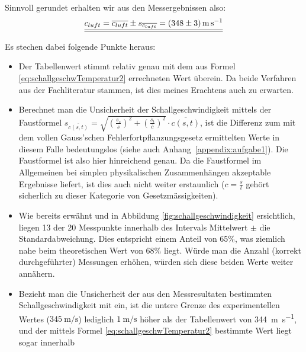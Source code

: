 Sinnvoll gerundet erhalten wir aus den Messergebnissen also:
\begin{equation}
    \underline{\underline{c_{luft} = \overline{c_{luft}} \pm s_{\overline{c_{luft}}} = \SI[separate-uncertainty = true]{348 \pm 3}{\meter\per\second}}}
\end{equation}

Es stechen dabei folgende Punkte heraus:
\begin{itemize}
    \item
        Der   Tabellenwert   stimmt  relativ   genau   mit   dem  aus   Formel
        \ref{eq:schallgeschwTemperatur2} errechneten  Wert \"uberein. Da beide
        Verfahren  aus der  Fachliteratur stammen,  ist dies  meines Erachtens
        auch zu erwarten.
    \item
        Berechnet man  die Unsicherheit der Schallgeschwindigkeit  mittels der
        Faustformel  $s_{\overline{c(s,t)}}  = \sqrt{  \left(  \frac{s_{s}}{s}
        \right)^2   +  \left(   \frac{s_{t}}{\overline{c}}  \right)^2}   \cdot
        \overline{c(s,t)}$,   ist   die   Differenz   zum   mit   dem   vollen
        Gauss'schen  Fehlerfortpflanzungsgesetz  ermittelten Werte  in  diesem
        Falle  bedeutungslos (siehe  auch Anhang~\ref{appendix:aufgabe1}). Die
        Faustformel ist also hier hinreichend genau.
        Da  die   Faustformel  im   Allgemeinen  bei   simplen  physikalischen
        Zusammenh\"angen akzeptable  Ergebnisse liefert,  ist dies  auch nicht
        weiter erstaunlich  ($c =  \frac{s}{t}$ geh\"ort sicherlich  zu dieser
        Kategorie von Gesetzm\"assigkeiten).
    \item
        Wie bereits erw\"ahnt und in Abbildung \ref{fig:schallgeschwindigkeit}
        ersichtlich,  liegen  13 der  20  Messpunkte  innerhalb des  Intervals
        Mittelwert $\pm$ die  Standardabweichung. Dies entspricht einem Anteil
        von  65\%,  was  ziemlich  nahe   beim  theoretischen  Wert  von  68\%
        liegt. W\"urde  man die  Anzahl  (korrekt durchgef\"uhrter)  Messungen
        erh\"ohen, w\"urden sich diese beiden Werte weiter ann\"ahern.
    \item
        Bezieht   man   die   Unsicherheit    der   aus   den   Messresultaten
        bestimmten   Schallgeschwindigkeit    mit   ein,   ist    die   untere
        Grenze  des   experimentellen  Wertes  ($\SI{345}{\meter\per\second}$)
        lediglich  $\SI{1}{\meter\per\second}$  h\"oher als  der  Tabellenwert
        von    \SI{344}{\meter\per\second},    und    der    mittels    Formel
        \ref{eq:schallgeschwTemperatur2} bestimmte Wert  liegt sogar innerhalb

\end{itemize}
